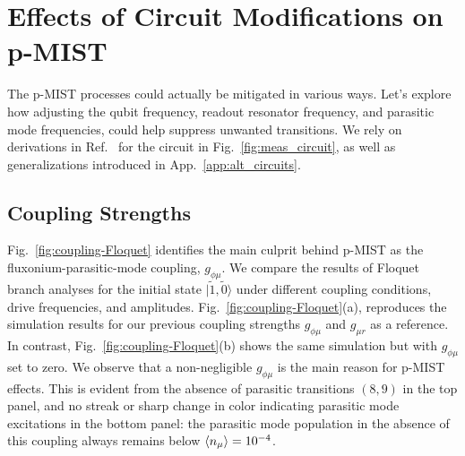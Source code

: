\documentclass[%
reprint,
superscriptaddress,
 amsmath,amssymb,
 aps,
 prx,
longbibliography,
floatfix,
]{revtex4-2}
\begin{document}
\section{Effects of Circuit Modifications on p-MIST}\label{sec:expressions}
The p-MIST processes could actually be mitigated in various ways. Let's explore how adjusting the qubit frequency, readout resonator frequency, and parasitic mode frequencies, could help suppress unwanted transitions. We rely on derivations in Ref.~\cite{viola2015collective} for the circuit in Fig.~\ref{fig:meas_circuit}, as well as generalizations introduced in App.~\ref{app:alt_circuits}.



\subsection{Coupling Strengths} \label{sec:coupling}

Fig.~\ref{fig:coupling-Floquet} identifies the main culprit behind p-MIST as the fluxonium-parasitic-mode coupling, $g_{\phi \mu}$. We compare the results of Floquet branch analyses for the initial state $|\tilde{1}, \tilde{0}\rangle$ under different coupling conditions, drive frequencies, and amplitudes. Fig.~\ref{fig:coupling-Floquet}(a), reproduces  the simulation results for our previous coupling strengths $g_{\phi\mu}$ and $g_{\mu r}$ as a reference. In contrast, Fig.~\ref{fig:coupling-Floquet}(b) shows the same simulation but with $g_{\phi \mu}$ set to zero. We observe that a non-negligible $g_{\phi\mu}$ is the main reason for p-MIST effects. This is evident from the absence of parasitic transitions $(8,9)$ in the top panel, and no streak or sharp change in color indicating parasitic mode excitations in the bottom panel:  the parasitic mode population in the absence of this coupling always remains below $\braket{n_\mu}=10^{-4}$. 
\end{document}
